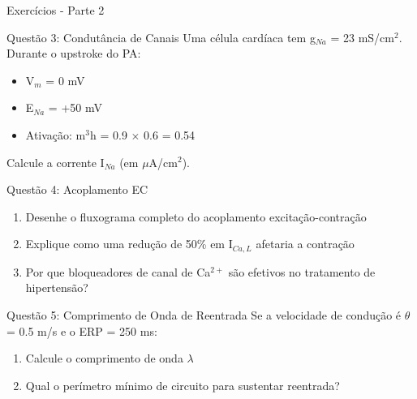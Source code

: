 \begin{frame}{Exercícios - Parte 2}
\begin{block}{Questão 3: Condutância de Canais}
Uma célula cardíaca tem g$_{Na}$ = 23 mS/cm$^2$. Durante o upstroke do PA:
\begin{itemize}
    \item V$_m$ = 0 mV
    \item E$_{Na}$ = +50 mV
    \item Ativação: m$^3$h = 0.9 $\times$ 0.6 = 0.54
\end{itemize}

Calcule a corrente I$_{Na}$ (em $\mu$A/cm$^2$).
\end{block}

\begin{block}{Questão 4: Acoplamento EC}
\begin{enumerate}
    \item Desenhe o fluxograma completo do acoplamento excitação-contração
    \item Explique como uma redução de 50\% em I$_{Ca,L}$ afetaria a contração
    \item Por que bloqueadores de canal de Ca$^{2+}$ são efetivos no tratamento de hipertensão?
\end{enumerate}
\end{block}

\begin{block}{Questão 5: Comprimento de Onda de Reentrada}
Se a velocidade de condução é $\theta$ = 0.5 m/s e o ERP = 250 ms:
\begin{enumerate}
    \item Calcule o comprimento de onda $\lambda$
    \item Qual o perímetro mínimo de circuito para sustentar reentrada?
\end{enumerate}
\end{block}
\end{frame}

